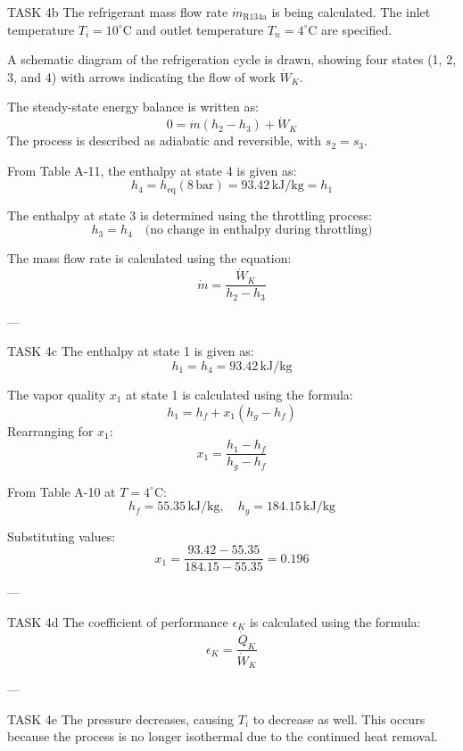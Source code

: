 TASK 4b  
The refrigerant mass flow rate \( \dot{m}_{\text{R134a}} \) is being calculated. The inlet temperature \( T_i = 10^\circ\text{C} \) and outlet temperature \( T_n = 4^\circ\text{C} \) are specified.  

A schematic diagram of the refrigeration cycle is drawn, showing four states (1, 2, 3, and 4) with arrows indicating the flow of work \( \dot{W}_K \).  

The steady-state energy balance is written as:  
\[
0 = \dot{m} (h_2 - h_3) + \dot{W}_K
\]  
The process is described as adiabatic and reversible, with \( s_2 = s_3 \).  

From Table A-11, the enthalpy at state 4 is given as:  
\[
h_4 = h_{\text{eq}}(8 \, \text{bar}) = 93.42 \, \text{kJ/kg} = h_1
\]  

The enthalpy at state 3 is determined using the throttling process:  
\[
h_3 = h_4 \quad \text{(no change in enthalpy during throttling)}
\]  

The mass flow rate is calculated using the equation:  
\[
\dot{m} = \frac{\dot{W}_K}{h_2 - h_3}
\]  

---

TASK 4c  
The enthalpy at state 1 is given as:  
\[
h_1 = h_4 = 93.42 \, \text{kJ/kg}
\]  

The vapor quality \( x_1 \) at state 1 is calculated using the formula:  
\[
h_1 = h_f + x_1 (h_g - h_f)
\]  
Rearranging for \( x_1 \):  
\[
x_1 = \frac{h_1 - h_f}{h_g - h_f}
\]  

From Table A-10 at \( T = 4^\circ\text{C} \):  
\[
h_f = 55.35 \, \text{kJ/kg}, \quad h_g = 184.15 \, \text{kJ/kg}
\]  

Substituting values:  
\[
x_1 = \frac{93.42 - 55.35}{184.15 - 55.35} = 0.196
\]  

---

TASK 4d  
The coefficient of performance \( \epsilon_K \) is calculated using the formula:  
\[
\epsilon_K = \frac{\dot{Q}_K}{\dot{W}_K}
\]  

---

TASK 4e  
The pressure decreases, causing \( T_i \) to decrease as well. This occurs because the process is no longer isothermal due to the continued heat removal.